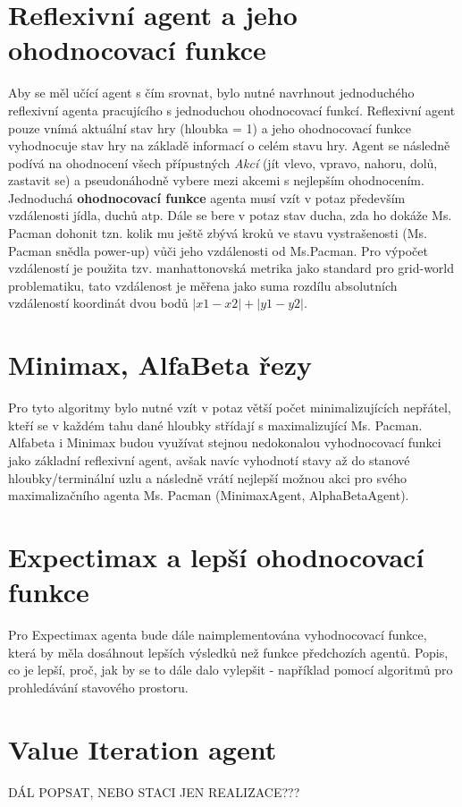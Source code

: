 \section{Reflexivní agent a jeho ohodnocovací funkce}
Aby se měl učící agent s čím srovnat, bylo nutné navrhnout jednoduchého reflexivní agenta pracujícího s jednoduchou ohodnocovací funkcí. Reflexivní agent pouze vnímá aktuální stav hry (hloubka = 1) a jeho ohodnocovací funkce vyhodnocuje stav hry na základě informací o celém stavu hry. Agent se následně podívá na ohodnocení všech přípustných \textit{Akcí} (jít vlevo, vpravo, nahoru, dolů, zastavit se) a pseudonáhodně vybere mezi akcemi s nejlepším ohodnocením.  Jednoduchá \textbf{ohodnocovací funkce} agenta musí vzít v potaz především vzdálenosti jídla, duchů atp. Dále se bere v potaz stav ducha, zda ho dokáže Ms. Pacman dohonit tzn. kolik mu ještě zbývá kroků ve stavu vystrašenosti (Ms. Pacman snědla power-up) vůči jeho vzdálenosti od Ms.Pacman. Pro výpočet vzdáleností je použita tzv. manhattonovská metrika jako standard pro grid-world problematiku, tato vzdálenost je měřena jako suma rozdílu absolutních vzdáleností koordinát dvou bodů $\left|x1-x2\right|+\left|y1-y2\right|$.

\section{Minimax, AlfaBeta řezy}
Pro tyto algoritmy bylo nutné vzít v potaz větší počet minimalizujících nepřátel, kteří se v každém tahu dané hloubky střídají s maximalizující Ms. Pacman. Alfabeta i Minimax budou využívat stejnou nedokonalou vyhodnocovací funkci jako základní reflexivní agent, avšak navíc vyhodnotí stavy až do stanové hloubky/terminální uzlu a následně vrátí nejlepší možnou akci pro svého maximalizačního agenta Ms. Pacman (MinimaxAgent, AlphaBetaAgent).
\section{Expectimax a lepší ohodnocovací funkce}
Pro Expectimax agenta bude dále naimplementována vyhodnocovací funkce, která by měla dosáhnout lepších výsledků než funkce předchozích agentů. Popis, co je lepší, proč, jak by se to dále dalo vylepšit - například pomocí algoritmů pro prohledávání stavového prostoru.

\section{Value Iteration agent}
DÁL POPSAT, NEBO STACI JEN REALIZACE???
